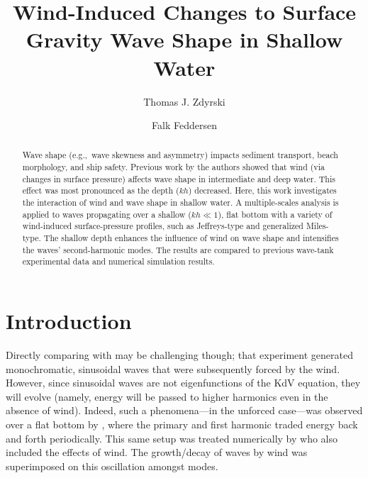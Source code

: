 \documentclass{jfm}
\title{Wind-Induced Changes to Surface Gravity Wave Shape in Shallow Water}
\author{Thomas J. Zdyrski \and Falk Feddersen}
\let\Oldsection\section
\renewcommand{\section}{\FloatBarrier\Oldsection}
\begin{document}
\maketitle

\begin{abstract}
Wave shape (e.g.,\ wave skewness and asymmetry) impacts sediment
transport, beach morphology, and ship safety.
Previous work by the authors showed that wind (via changes in surface
pressure) affects wave shape in intermediate and deep water.
This effect was most pronounced as the depth ($kh$) decreased.
Here, this work investigates the interaction of wind and wave shape in
shallow water.
A multiple-scales analysis is applied to waves propagating over a
shallow ($kh \ll 1$), flat bottom with a variety of wind-induced
surface-pressure profiles, such as Jeffreys-type and generalized
Miles-type.
The shallow depth enhances the influence of wind on wave shape and
intensifies the waves' second-harmonic modes.
The results are compared to previous wave-tank experimental data and
numerical simulation results.
\end{abstract}

\section{Introduction}
Directly comparing with \citet{feddersen2005wind} may be challenging
though; that experiment generated monochromatic, sinusoidal waves that
were subsequently forced by the wind.
However, since sinusoidal waves are not eigenfunctions of the KdV
equation, they will evolve (namely, energy will be passed to higher
harmonics even in the absence of wind).
Indeed, such a phenomena---in the unforced case---was observed over a
flat bottom by \citet{elgar1990recurrence,chapalain1992observed},
where the primary and first harmonic traded energy back and forth
periodically.
This same setup was treated numerically by \citet{liu2016modeling}
who also included the effects of wind.
The growth/decay of waves by wind was superimposed on this oscillation
amongst modes.
\end{document}
